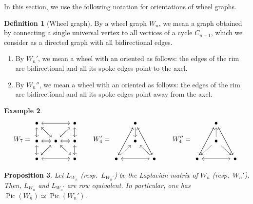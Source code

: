 \documentclass[11pt,reqno]{amsart}
\DeclareMathOperator{\Pic}{Pic}
\theoremstyle{definition}
\newtheorem{mydef}{Definition}[section]
\newtheorem{myeg}[mydef]{Example}
\theoremstyle{plain}
\newtheorem{proposition}[mydef]{Proposition}
\begin{document}
In this section, we use the following notation for orientations of wheel graphs. 

\begin{mydef}[{Wheel graph}]
By a wheel graph $W_n$, we mean a graph obtained by connecting a single universal vertex to all vertices of a cycle $C_{n-1}$, which we consider as a directed graph with all bidirectional edges. 
\begin{enumerate}
	\item 
By $W_n'$, we mean a wheel with an oriented as follows: the edges of the rim are bidirectional and all its spoke edges point to the axel.
\item 
By $W_n''$, we mean a wheel with an oriented as follows: the edges of the rim are bidirectional and all its spoke edges point away from the axel.
\end{enumerate}
\end{mydef}



\begin{myeg}\label{example: wheel graph orientations}
\[
W_7=\begin{tikzcd}[row sep=0.5cm, column sep=0.5cm]
	\bullet \arrow[dr] \arrow[d]\arrow[rr]& &\bullet \arrow[d] \arrow[ll] \arrow[dl]\\
	\bullet \arrow[r]\arrow[u]\arrow[d]& \bullet \arrow[l] \arrow[ru] \arrow[lu] \arrow[dl] \arrow[dr] \arrow[r]& \bullet\arrow[d] \arrow[l] \arrow[u]\\
	\bullet \arrow[rr] \arrow[u] \arrow[ru] & &\bullet \arrow[u] \arrow[ul] \arrow[ll]
\end{tikzcd} \qquad W_4'=\begin{tikzcd}[row sep=0.5cm, column sep=0.5cm]
	& \bullet  \arrow[ldd] \arrow[rdd] \arrow[d] & \\
	& \bullet & \\
	\bullet \arrow[ru]\arrow[rr] \arrow[ruu] & & \bullet \arrow[lu] \arrow[luu] \arrow[ll]
\end{tikzcd} \qquad W_4''=\begin{tikzcd}[row sep=0.5cm, column sep=0.5cm]
& \bullet  \arrow[ldd] \arrow[rdd]  & \\
& \bullet \arrow[u] \arrow[dl] \arrow[dr] & \\
\bullet \arrow[rr] \arrow[ruu] & & \bullet  \arrow[luu] \arrow[ll]
\end{tikzcd}
\]
\end{myeg}

\begin{proposition}\label{proposition: wheel1}
Let $L_{W_n}$ (resp.~$L_{W_n'}$) be the Laplacian matrix of $W_n$ (resp.~$W_n'$). Then, $L_{W_n}$ and $L_{W_n'}$ are row equivalent. In particular, one has $\Pic (W_n) \simeq \Pic (W_n')$.
\end{proposition}
\end{document}
